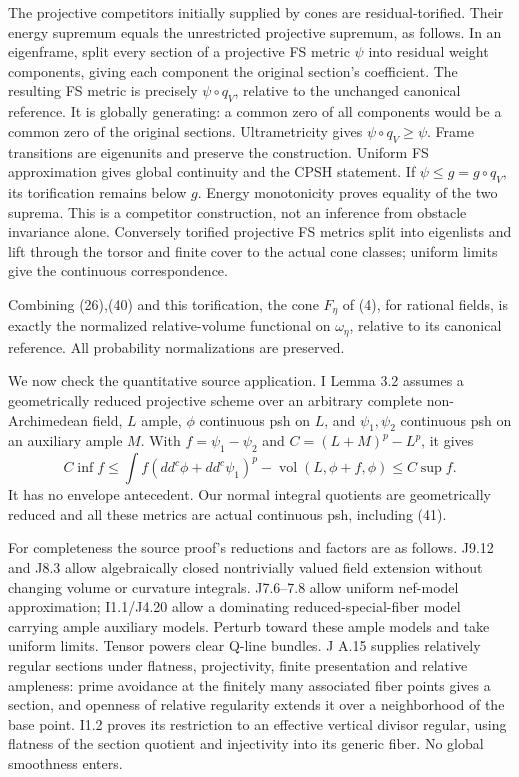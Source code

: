 \documentclass[
  10pt,
]{article}
\begin{document}
The projective competitors initially supplied by cones are
residual-torified. Their energy supremum equals the unrestricted
projective supremum, as follows. In an eigenframe, split every section
of a projective FS metric \(\psi\) into residual weight components,
giving each component the original section's coefficient. The resulting
FS metric is precisely \(\psi\circ q_V\), relative to the unchanged
canonical reference. It is globally generating: a common zero of all
components would be a common zero of the original sections.
Ultrametricity gives \(\psi\circ q_V\geq\psi\). Frame transitions are
eigenunits and preserve the construction. Uniform FS approximation gives
global continuity and the CPSH statement. If \(\psi\leq g=g\circ q_V\),
its torification remains below \(g\). Energy monotonicity proves
equality of the two suprema. This is a competitor construction, not an
inference from obstacle invariance alone. Conversely torified projective
FS metrics split into eigenlists and lift through the torsor and finite
cover to the actual cone classes; uniform limits give the continuous
correspondence.

Combining (26),(40) and this torification, the cone \(F_\eta\) of (4),
for rational fields, is exactly the normalized relative-volume
functional on \(\omega_\eta\), relative to its canonical reference. All
probability normalizations are preserved.

We now check the quantitative source application. I Lemma 3.2 assumes a
geometrically reduced projective scheme over an arbitrary complete
non-Archimedean field, \(L\) ample, \(\phi\) continuous psh on \(L\),
and \(\psi_1,\psi_2\) continuous psh on an auxiliary ample \(M\). With
\(f=\psi_1-\psi_2\) and \(C=(L+M)^p-L^p\), it gives
\[ C\inf f\leq\int f(dd^c\phi+dd^c\psi_1)^p-\operatorname{vol}(L,\phi+f,\phi)\leq C\sup f.          \tag{42}\]
It has no envelope antecedent. Our normal integral quotients are
geometrically reduced and all these metrics are actual continuous psh,
including (41).

For completeness the source proof's reductions and factors are as
follows. J9.12 and J8.3 allow algebraically closed nontrivially valued
field extension without changing volume or curvature integrals.
J7.6--7.8 allow uniform nef-model approximation; I1.1/J4.20 allow a
dominating reduced-special-fiber model carrying ample auxiliary models.
Perturb toward these ample models and take uniform limits. Tensor powers
clear Q-line bundles. J A.15 supplies relatively regular sections under
flatness, projectivity, finite presentation and relative ampleness:
prime avoidance at the finitely many associated fiber points gives a
section, and openness of relative regularity extends it over a
neighborhood of the base point. I1.2 proves its restriction to an
effective vertical divisor regular, using flatness of the section
quotient and injectivity into its generic fiber. No global smoothness
enters.
\end{document}
